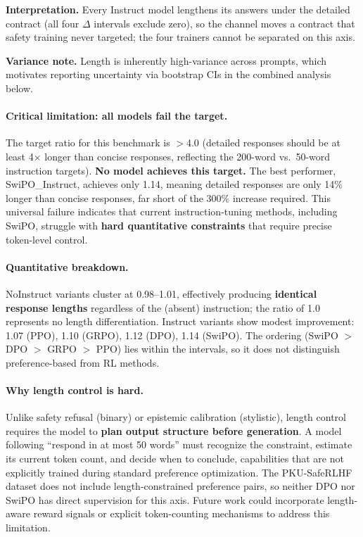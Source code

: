 \vspace{-0.2em}
\noindent\textbf{Interpretation.}
Every Instruct model lengthens its answers under the detailed contract (all four $\Delta$ intervals exclude zero), so the channel moves a contract that safety training never targeted; the four trainers cannot be separated on this axis.

\vspace{-0.2em}
\noindent\textbf{Variance note.}
Length is inherently high-variance across prompts, which motivates reporting uncertainty via bootstrap CIs in the combined analysis below.

\paragraph{Critical limitation: all models fail the target.}
The target ratio for this benchmark is $>$4.0 (detailed responses should be at least 4$\times$ longer than concise responses, reflecting the 200-word vs.\ 50-word instruction targets).
\textbf{No model achieves this target.}
The best performer, SwiPO\_Instruct, achieves only 1.14, meaning detailed responses are only 14\% longer than concise responses, far short of the 300\% increase required.
This universal failure indicates that current instruction-tuning methods, including SwiPO, struggle with \textbf{hard quantitative constraints} that require precise token-level control.

\paragraph{Quantitative breakdown.}
NoInstruct variants cluster at 0.98--1.01, effectively producing \textbf{identical response lengths} regardless of the (absent) instruction; the ratio of 1.0 represents no length differentiation.
Instruct variants show modest improvement: 1.07 (\textsc{PPO}), 1.10 (\textsc{GRPO}), 1.12 (\textsc{DPO}), 1.14 (SwiPO).
The ordering (SwiPO $>$ \textsc{DPO} $>$ \textsc{GRPO} $>$ \textsc{PPO}) lies within the intervals, so it does not distinguish preference-based from RL methods.

\paragraph{Why length control is hard.}
Unlike safety refusal (binary) or epistemic calibration (stylistic), length control requires the model to \textbf{plan output structure before generation}.
A model following ``respond in at most 50 words'' must recognize the constraint, estimate its current token count, and decide when to conclude, capabilities that are not explicitly trained during standard preference optimization.
The PKU-SafeRLHF dataset does not include length-constrained preference pairs, so neither DPO nor SwiPO has direct supervision for this axis.
Future work could incorporate length-aware reward signals or explicit token-counting mechanisms to address this limitation.


